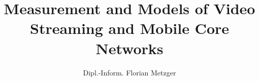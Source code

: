 
\title{Measurement and Models of Video Streaming and Mobile Core Networks}
\author{Dipl.-Inform. Florian Metzger}
\newcommand{\betreuer}{Univ.-Prof.~Dipl.-Ing.~Dr.~Helmut Hlavacs}
\newcommand{\gutachterA}{Univ.-Prof.~Dipl.-Math.~Dr.~Peter Reichl,~M.A.~St.}
\newcommand{\gutachterB}{~}

\newcommand{\dissertationsgebiet}{Informatik}
\newcommand{\studienkennzahl}{A 786 880}
\newcommand{\akademischergrad}{Doktor der technischen Wissenschaften (Dr. tech.)}